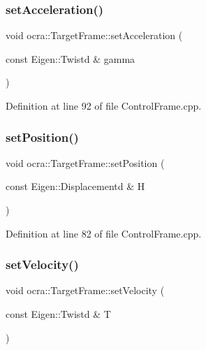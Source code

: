 \subsubsection{\texorpdfstring{set\+Acceleration()}{setAcceleration()}}
{\footnotesize\ttfamily void ocra\+::\+Target\+Frame\+::set\+Acceleration (\begin{DoxyParamCaption}\item[{const Eigen\+::\+Twistd \&}]{gamma }\end{DoxyParamCaption})}



Definition at line 92 of file Control\+Frame.\+cpp.

\hypertarget{classocra_1_1TargetFrame_a760081f3ae88a43ff91dc6a746083286}{}\label{classocra_1_1TargetFrame_a760081f3ae88a43ff91dc6a746083286} 
\subsubsection{\texorpdfstring{set\+Position()}{setPosition()}}
{\footnotesize\ttfamily void ocra\+::\+Target\+Frame\+::set\+Position (\begin{DoxyParamCaption}\item[{const Eigen\+::\+Displacementd \&}]{H }\end{DoxyParamCaption})}



Definition at line 82 of file Control\+Frame.\+cpp.

\hypertarget{classocra_1_1TargetFrame_aff778ddb4526e90b927ec12bda52e8d6}{}\label{classocra_1_1TargetFrame_aff778ddb4526e90b927ec12bda52e8d6} 
\subsubsection{\texorpdfstring{set\+Velocity()}{setVelocity()}}
{\footnotesize\ttfamily void ocra\+::\+Target\+Frame\+::set\+Velocity (\begin{DoxyParamCaption}\item[{const Eigen\+::\+Twistd \&}]{T }\end{DoxyParamCaption})}



